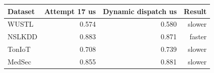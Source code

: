\begin{tabular}{lrrr}
\toprule
Dataset & Attempt 17 us & Dynamic dispatch us & Result \\
\midrule
WUSTL & 0.574 & 0.580 & slower \\
NSLKDD & 0.883 & 0.871 & faster \\
TonIoT & 0.708 & 0.739 & slower \\
MedSec & 0.855 & 0.881 & slower \\
\bottomrule
\end{tabular}
